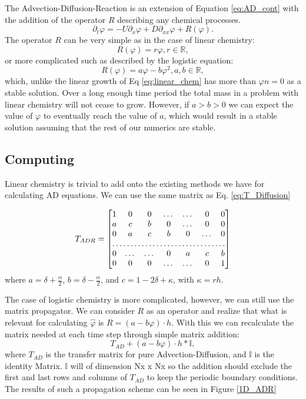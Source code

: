\documentclass[]{article}
\begin{document}
The Advection-Diffusion-Reaction is an extension of Equation \ref{eq:AD_cont} with the addition of the operator $R$ describing any chemical processes.
\begin{equation}
\partial_t \varphi = -U \partial_x \varphi + D \partial_{xx}\varphi + R(\varphi).
\label{eq:ADR_cont}
\end{equation}
The operator $R$ can be very simple as in the case of linear chemistry:
\begin{equation}
R(\varphi) = r \varphi, r \in \mathbb{R},
\label{eq:linear_chem}
\end{equation}
or more complicated such as described by the logistic equation:
\begin{equation}
R(\varphi) = a \varphi-b \varphi^2, a,b \in \mathbb{R},
\label{eq:chem_logis}
\end{equation}
which, unlike the linear growth of Eq \ref{eq:linear_chem} has more than $\varphi  n= 0$ as a stable solution. Over a long enough time period the total mass in a problem with linear chemistry will not cease to grow. However, if $a > b > 0$ we can expect the value of $\varphi$ to eventually reach the value of $a$, which would result in a stable solution assuming that the rest of our numerics are stable. 

\subsection{Computing}
Linear chemistry is trivial to add onto the existing methods we have for calculating AD equations. We can use the same matrix as Eq. \ref{eq:T_Diffusion}

\begin{equation}
T_{ADR}=\begin{bmatrix} 
1       & 0 & 0 &\dots& \dots &0&0 \\
a      & c & b & 0&\dots & 0 &0\\
0& a & c & b & 0 &\dots & 0 \\
\hdotsfor{7} \\
0 &\dots & \dots & 0&a & c & b  \\
0     &0  & 0 & \dots&\dots & 0&1
\end{bmatrix}
\label{eq:T_Diffusion_2}
\end{equation}
where $a = \delta +\frac{\alpha}{2}$, $b =\delta-\frac{\alpha}{2}$, and $c=1-2\delta +\kappa$, with $\kappa = r h$. 

The case of logistic chemistry is more complicated, however, we can still use the matrix propagator. We can consider $R$ as an operator and realize that what is relevant for calculating $\hat{\varphi}$ is $R = (a - b \varphi) \cdot h$. With this we can recalculate the matrix needed at each time step through simple matrix addition:
\begin{equation}
T_{AD} + (a - b \varphi) \cdot h * \mathbb{I},
\end{equation}
where $T_{AD}$ is the transfer matrix for pure Advection-Diffusion, and $\mathbb{I}$ is the identity Matrix. $\mathbb{I}$ will of dimension Nx x Nx so the addition should exclude the first and last rows and columns of $T_{AD}$ to keep the periodic boundary conditions. The results of such a propagation scheme can be seen in Figure \ref{1D_ADR}
\end{document}

